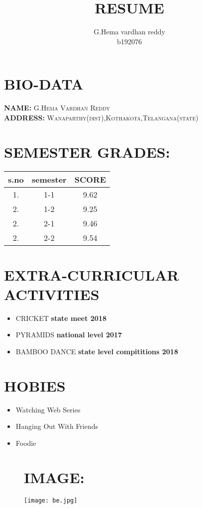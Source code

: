 \documentclass[a3paper,10pt]{article}
\title{\textbf{RESUME}}
\author{G.Hema vardhan reddy\\b192076}
\begin{document}
\pagecolor{lightgray}
\maketitle
\color{red}
\section{BIO-DATA}
\color{black}
\textbf{NAME:}
\textsc{G.Hema Vardhan Reddy}\\
\textbf{ADDRESS:}
\textsc{Wanaparthy(dist),Kothakota,Telangana(state)}\\
\color{red}
\section{SEMESTER GRADES:}
\begin{table}[h]
\centering
 \begin{tabular}{|c |c |c |}
 \hline
 s.no & semester & SCORE\\
 \hline
 1. & 1-1 & 9.62\\
 \hline
 2. & 1-2 & 9.25\\
 \hline
 2. & 2-1 & 9.46\\
 \hline
 2. & 2-2 & 9.54\\
 \hline
 \end{tabular}

\end{table}
\color{red}
\section{EXTRA-CURRICULAR ACTIVITIES}
\color{black}
\begin{itemize}
 \item CRICKET \textbf{state meet 2018}
 \item PYRAMIDS \textbf{national level 2017}
 \item BAMBOO DANCE \textbf{state level compititions 2018}
\end{itemize}
\color{red}
\section{HOBIES}
\color{black}
\begin{itemize}
 \item Watching Web Series
 \item Hanging Out With Friends
 \item Foodie
\end{itemize}
\begin{figure}
\color{red}
\section{IMAGE:}
\centering
 \texttt{[image: be.jpg]}
\end{figure}
\end{document}
